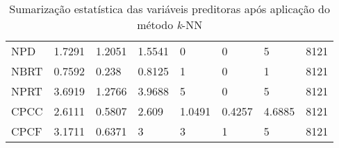 \begin{table}[!htbp]
\begin{tabular}{@{}llllllll@{}}
NPD   & 1.7291                    & 1.2051                            & 1.5541                      & 0                        & 0                        & 5                        & 8121                  \\
NBRT  & 0.7592                    & 0.238                             & 0.8125                      & 1                        & 0                        & 1                        & 8121                  \\
NPRT  & 3.6919                    & 1.2766                            & 3.9688                      & 5                        & 0                        & 5                        & 8121                  \\
CPCC  & 2.6111                    & 0.5807                            & 2.609                       & 1.0491                   & 0.4257                   & 4.6885                   & 8121                  \\
CPCF  & 3.1711                    & 0.6371                            & 3                           & 3                        & 1                        & 5                        & 8121                  \\ \bottomrule
\end{tabular}
\caption{Sumarização estatística das variáveis preditoras após aplicação do método \textit{k}-NN}
\label{tbl: sum-stats}
\end{table}
